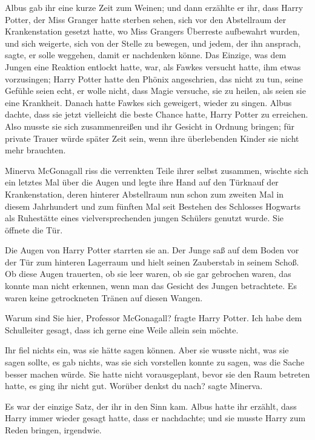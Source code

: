 Albus gab ihr eine kurze Zeit zum Weinen; und dann erzählte er ihr, dass Harry
Potter, der Miss Granger hatte sterben sehen, sich vor den Abstellraum der
Krankenstation gesetzt hatte, wo Miss Grangers Überreste aufbewahrt wurden, und
sich weigerte, sich von der Stelle zu bewegen, und jedem, der ihn ansprach,
sagte, er solle weggehen, damit er nachdenken könne. Das Einzige, was dem Jungen
eine Reaktion entlockt hatte, war, als Fawkes versucht hatte, ihm etwas
vorzusingen; Harry Potter hatte den Phönix angeschrien, das nicht zu tun, seine
Gefühle seien echt, er wolle nicht, dass Magie versuche, sie zu heilen, als
seien sie eine Krankheit. Danach hatte Fawkes sich geweigert, wieder zu singen.
Albus dachte, dass sie jetzt vielleicht die beste Chance hatte, Harry Potter zu
erreichen. Also musste sie sich zusammenreißen und ihr Gesicht in Ordnung
bringen; für private Trauer würde später Zeit sein, wenn ihre überlebenden
Kinder sie nicht mehr brauchten.

Minerva McGonagall riss die verrenkten Teile ihrer selbst zusammen, wischte sich
ein letztes Mal über die Augen und legte ihre Hand auf den Türknauf der
Krankenstation, deren hinterer Abstellraum nun schon zum zweiten Mal in diesem
Jahrhundert und zum fünften Mal seit Bestehen des Schlosses Hogwarts als
Ruhestätte eines vielversprechenden jungen Schülers genutzt wurde. Sie öffnete
die Tür.

Die Augen von Harry Potter starrten sie an. Der Junge saß auf dem Boden vor der
Tür zum hinteren Lagerraum und hielt seinen Zauberstab in seinem Schoß. Ob diese
Augen trauerten, ob sie leer waren, ob sie gar gebrochen waren, das konnte man
nicht erkennen, wenn man das Gesicht des Jungen betrachtete. Es waren keine
getrockneten Tränen auf diesen Wangen.

\glqq Warum sind Sie hier, Professor McGonagall?\grqq{} fragte Harry Potter.
\glqq Ich habe dem Schulleiter gesagt, dass ich gerne eine Weile allein sein
möchte.\grqq{}

Ihr fiel nichts ein, was sie hätte sagen können. Aber sie wusste nicht, was sie
sagen sollte, es gab nichts, was sie sich vorstellen konnte zu sagen, was die
Sache besser machen würde. Sie hatte nicht vorausgeplant, bevor sie den Raum
betreten hatte, es ging ihr nicht gut. \glqq Worüber denkst du nach?\grqq{}
sagte Minerva.

Es war der einzige Satz, der ihr in den Sinn kam. Albus hatte ihr erzählt, dass
Harry immer wieder gesagt hatte, dass er nachdachte; und sie musste Harry zum
Reden bringen, irgendwie.

